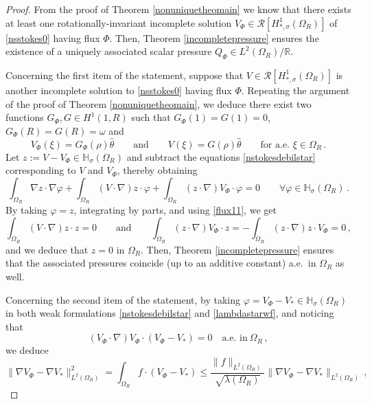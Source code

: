 \documentclass[10pt,a4paper]{amsart}
\begin{document}
\begin{proof} From the proof of Theorem
\ref{nonuniquetheomain} we know that there exists at least one rotationally-invariant incomplete solution $V_{\Phi} \in
\mathcal{R}[H^{1}_{*,\sigma}(\Omega_{R})]$ of \eqref{nsstokes0} having flux $\Phi$. Then, Theorem \ref{incompletepressure} ensures the existence
of a uniquely associated scalar pressure $Q_\Phi\in L^{2}(\Omega_{R})/\mathbb{R}$.\par
Concerning the first item of the statement, suppose that $V \in \mathcal{R}[H^{1}_{*,\sigma}(\Omega_{R})]$ is another incomplete solution to
\eqref{nsstokes0} having flux $\Phi$. Repeating the argument of the proof of Theorem \ref{nonuniquetheomain}, we deduce there exist two functions
$G_{\Phi}, G \in H^{1}(1,R)$ such that $G_{\Phi}(1)=G(1)=0$, $G_{\Phi}(R)=G(R)=\omega$ and
\begin{equation} \label{flux11}
V_{\Phi}(\xi) = G_{\Phi}(\rho) \widehat{\theta} \qquad \text{and} \qquad  V(\xi) = G(\rho) \widehat{\theta} \qquad \text{for a.e. }\xi \in
\Omega_{R} \, .
\end{equation}
Let $z := V - V_{\Phi} \in \mathbb{H}_{\sigma}(\Omega_{R})$ and subtract the equations \eqref{nstokesdebilstar} corresponding to $V$
and $V_{\Phi}$, thereby obtaining
$$
\int_{\Omega_{R}} \nabla z \cdot \nabla \varphi + \int_{\Omega_{R}} (V \cdot \nabla) z \cdot \varphi + \int_{\Omega_{R}} (z \cdot \nabla) V_{\Phi}
\cdot \varphi = 0 \qquad \forall \varphi \in \mathbb{H}_{\sigma}(\Omega_{R}) \, .
$$
By taking $\varphi=z$, integrating by parts, and using \eqref{flux11}, we get
$$
\int_{\Omega_{R}} (V \cdot \nabla) z \cdot z = 0 \qquad \text{and} \qquad \int_{\Omega_{R}} (z \cdot \nabla) V_{\Phi} \cdot z = -
\int_{\Omega_{R}} (z \cdot \nabla) z \cdot V_{\Phi} = 0 \, ,
$$
and we deduce that $z=0$ in $\Omega_{R}$. Then, Theorem \ref{incompletepressure} ensures that the associated pressures coincide (up to an additive constant)
a.e.\ in $\Omega_{R}$ as well.
\par
Concerning the second item of the statement, by taking $\varphi = V_{\Phi} - V_{*} \in \mathbb{H}_{\sigma}(\Omega_{R})$ in both weak formulations
\eqref{nstokesdebilstar} and \eqref{lambdastarwf}, and noticing that
$$
(V_{\Phi} \cdot \nabla) V_{\Phi} \cdot (V_{\Phi} - V_{*}) =0 \quad \text{a.e. in} \ \Omega_{R} \, ,
$$
we deduce
$$
\| \nabla V_{\Phi} - \nabla V_{*} \|^{2}_{L^{2}(\Omega_{R})} = \int_{\Omega_{R}} f \cdot (V_{\Phi} - V_{*}) \leq
\dfrac{\|f\|_{L^2(\Omega_{R})}}{\sqrt{\lambda(\Omega_{R})}} \| \nabla V_{\Phi} - \nabla V_{*} \|_{L^{2}(\Omega_{R})} \, ,
$$
\end{proof}
\end{document}
